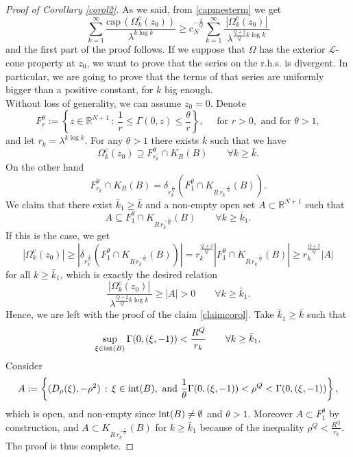 \documentclass[10pt]{amsart}
\def \RNu {\mathbb{R}^{N+1}}
\def \l {\lambda}
\def\elle{\mathcal{L}}
\numberwithin{equation}{section}
\begin{document}
\begin{proof}[Proof of Corollary \ref{corol2}]
As we said, from \eqref{capmesterm} we get
$$\sum_{k=1}^{\infty}{\frac{\mathrm{cap\, } (\Omega^c_k(z_0))}{\l^{k\log{k}}}}\geq c_N^{-\frac{2}{Q}} \sum_{k=1}^{\infty}{\frac{|\Omega^c_k(z_0)|}{\,\,\l^{\frac{Q+2}{Q}k\log{k}}\,\,}}$$
and the first part of the proof follows. If we suppose that $\Omega$ has the exterior $\elle$-cone property at $z_0$, we want to prove that the series on the r.h.s. is divergent. In particular, we are going to prove that the terms of that series are uniformly bigger than a positive constant, for $k$ big enough.\\
Without loss of generality, we can assume $z_0=0$. Denote
$$F_r^{\theta}:=\left\{z\in\RNu\,:\, \frac{1}{r}\leq \Gamma(0,z)\leq\frac{\theta}{r}\right\},\quad\mbox{ for }r>0, \mbox{ and for }\theta>1,$$
and let $r_k=\lambda^{k\log{k}}$. For any $\theta>1$ there exists $\bar{k}$ such that we have
$$\Omega^c_k(z_0)\supseteq F_{r_k}^{\theta}\cap K_R(B)\qquad\forall k\geq\bar{k}.$$
On the other hand $$F_{r_k}^{\theta}\cap K_R(B)=\delta_{r_k^{\frac{1}{Q}}}\left(F_1^\theta\cap K_{R\,r_k^{-\frac{1}{Q}}}(B)\right).$$
We claim that there exist $\bar{k}_1\geq\bar{k}$ and a non-empty open set $A\subset \RNu$ such that 
\begin{equation}\label{claimcorol}
A\subseteq F_1^\theta\cap K_{R\,r_k^{-\frac{1}{Q}}}(B)\qquad \forall k\geq\bar{k}_1.
\end{equation}
If this is the case, we get
$$|\Omega^c_k(z_0)|\geq\left|\delta_{r_k^{\frac{1}{Q}}}\left(F_1^\theta\cap K_{R\,r_k^{-\frac{1}{Q}}}(B)\right)\right|=r_k^{\frac{Q+2}{Q}}|F_1^\theta\cap K_{R\,r_k^{-\frac{1}{Q}}}(B)|\geq r_k^{\frac{Q+2}{Q}}|A|$$
for all $k\geq\bar{k}_1$, which is exactly the desired relation
$$\frac{|\Omega^c_k(z_0)|}{\,\,\l^{\frac{Q+2}{Q}k\log{k}}\,\,}\geq |A|>0 \qquad \forall k\geq\bar{k}_1.$$
Hence, we are left with the proof of the claim \eqref{claimcorol}. Take $\bar{k}_1\geq\bar{k}$ such that
$$\sup_{\xi\in {\rm int}(B)}{\Gamma(0,(\xi,-1))}<\frac{R^Q}{r_k}\qquad\forall k\geq\bar{k}_1.$$
Consider 
$$A:=\left\{(D_\rho(\xi),-\rho^2)\,:\,\xi\in {\rm int}(B),\,\,\mbox{and }\frac{1}{\theta}\Gamma(0,(\xi,-1))<\rho^Q<\Gamma(0,(\xi,-1))\right\},$$
which is open, and non-empty since ${{\rm int}}(B)\neq\emptyset$ and $\theta>1$. Moreover $A\subset F^\theta_1$ by construction, and $A\subset K_{R\,r_k^{-\frac{1}{Q}}}(B)$ for $k\geq\bar{k}_1$ because of the inequality $\rho^Q<\frac{R^Q}{r_k}$. The proof is thus complete.
\end{proof}
\end{document}
